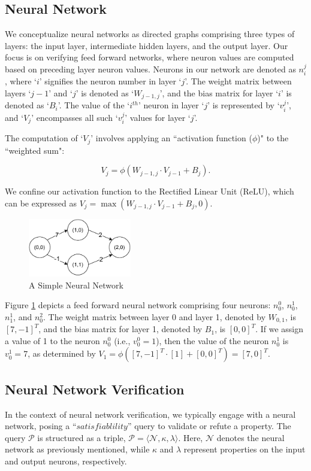 \subsection{Neural Network}
We conceptualize neural networks as directed graphs comprising three types of layers: the input layer, intermediate hidden layers, and the output layer. Our focus is on verifying feed forward networks, where neuron values are computed based on preceding layer neuron values. Neurons in our network are denoted as $n_{i}^{j}$, where `$i$' signifies the neuron number in layer `$j$'. The weight matrix between layers `${j-1}$' and `$j$' is denoted as `$W_{{j-1}, j}$', and the bias matrix for layer `$i$' is denoted as `$B_{i}$'. The value of the `$i^{th}$' neuron in layer `$j$' is represented by `$v_{i}^{j}$', and `$V_{j}$' encompasses all such `$v_{i}^{j}$' values for layer `$j$'.

The computation of `$V_{j}$' involves applying an ``activation function ($\phi$)" to the ``weighted sum":

\[V_{j} = \phi(W_{{j-1}, j} \cdot V_{j-1} + B_{j}).\] 

We confine our activation function to the Rectified Linear Unit (ReLU), which can be expressed as $V_{j} = \max(W_{j-1, j} \cdot V_{j-1} + B_{j}, 0)$.


\begin{figure}[H]
    \centering
    \includegraphics[width=0.4\textwidth]{diagrams/Basic_Neural_Network.pdf}
    \caption{A Simple Neural Network}
    \label{Figure: Simple Neurla}

\end{figure} 

Figure \ref{Figure: Simple Neurla} depicts a feed forward neural network comprising four neurons: $n_0^{0}$, $n_0^{1}$, $n_1^{1}$, and $n_0^{2}$. The weight matrix between layer 0 and layer 1, denoted by $W_{0,1}$, is $[7, -1]^T$, and the bias matrix for layer 1, denoted by $B_{1}$, is $[0, 0]^T$. If we assign a value of 1 to the neuron $n_0^{0}$ (i.e., $v_0^{0}=1$), then the value of the neuron $n_0^{1}$ is $v_0^{1}=7$, as determined by $V_{1} = \phi([7, -1]^{T} \cdot [1] + [0, 0]^{T}) = [7, 0]^{T}$.


\subsection{Neural Network Verification }
In the context of neural network verification, we typically engage with a neural network, posing a ``$\textit{satisfiablility}$'' query to validate or refute a property. The query \(\mathcal{P}\) is structured as a triple, \(\mathcal{P} = \langle \mathcal{N}, \kappa, \lambda \rangle\). Here, \(\mathcal{N}\) denotes the neural network as previously mentioned, while \(\kappa\) and \(\lambda\) represent properties on the input and output neurons, respectively. 

